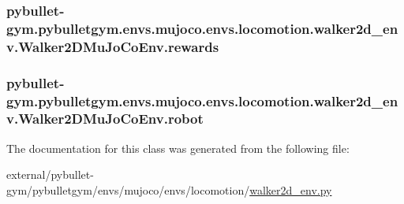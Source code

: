 \subsubsection[{\texorpdfstring{rewards}{rewards}}]{\setlength{\rightskip}{0pt plus 5cm}pybullet-\/gym.\+pybulletgym.\+envs.\+mujoco.\+envs.\+locomotion.\+walker2d\+\_\+env.\+Walker2\+D\+Mu\+Jo\+Co\+Env.\+rewards}\hypertarget{classpybullet-gym_1_1pybulletgym_1_1envs_1_1mujoco_1_1envs_1_1locomotion_1_1walker2d__env_1_1_walker2_d_mu_jo_co_env_a5f267408dd8fdd10eadaa2347f0e415e}{}\label{classpybullet-gym_1_1pybulletgym_1_1envs_1_1mujoco_1_1envs_1_1locomotion_1_1walker2d__env_1_1_walker2_d_mu_jo_co_env_a5f267408dd8fdd10eadaa2347f0e415e}
\subsubsection[{\texorpdfstring{robot}{robot}}]{\setlength{\rightskip}{0pt plus 5cm}pybullet-\/gym.\+pybulletgym.\+envs.\+mujoco.\+envs.\+locomotion.\+walker2d\+\_\+env.\+Walker2\+D\+Mu\+Jo\+Co\+Env.\+robot}\hypertarget{classpybullet-gym_1_1pybulletgym_1_1envs_1_1mujoco_1_1envs_1_1locomotion_1_1walker2d__env_1_1_walker2_d_mu_jo_co_env_a0ea9a0aa4a21b1a3b7053895f607aac0}{}\label{classpybullet-gym_1_1pybulletgym_1_1envs_1_1mujoco_1_1envs_1_1locomotion_1_1walker2d__env_1_1_walker2_d_mu_jo_co_env_a0ea9a0aa4a21b1a3b7053895f607aac0}


The documentation for this class was generated from the following file\+:\begin{DoxyCompactItemize}
\item 
external/pybullet-\/gym/pybulletgym/envs/mujoco/envs/locomotion/\hyperlink{mujoco_2envs_2locomotion_2walker2d__env_8py}{walker2d\+\_\+env.\+py}\end{DoxyCompactItemize}
